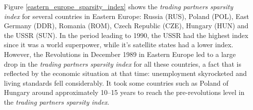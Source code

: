 Figure \ref{eastern_europe_sparsity_index} shows the \emph{trading partners sparsity index} for several countries in Eastern Europe: Russia (RUS), Poland (POL), East Germany (DDR), Romania (ROM), Czech Republic (CZE), Hungary (HUN) and the USSR (SUN). In the period leading to 1990, the USSR had the highest index since it was a world superpower, while it's satellite states had a lower index. However, the Revolutions in December 1989 in Eastern Europe led to a large drop in the \emph{trading partners sparsity index} for all these countries, a fact that is reflected by the economic situation at that time: unemployment skyrocketed and living standards fell considerably. It took some countries such as Poland of Hungary around approximately 10--15 years to reach the pre-revolutions level in the \emph{trading partners sparsity index}.

